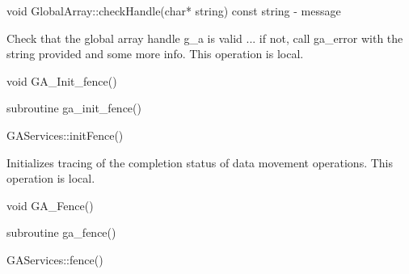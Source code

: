\documentclass[12pt]{article}
\begin{document}
\begin{cxxapi}
void GlobalArray::checkHandle(char* string) const
   string  - message                                                      \access{[input]}
\end{cxxapi}

\begin{desc}

Check that the global array handle g_a is valid ... if not, call ga_error with the string provided and some more info.
This operation is local.
\end{desc}


\begin{capi}
void GA_Init_fence()
\end{capi}

\begin{fapi}
subroutine ga_init_fence()
\end{fapi}

\begin{cxxapi}
GAServices::initFence()
\end{cxxapi}

\begin{desc}

Initializes tracing of the completion status of data movement operations.
This operation is local.
\end{desc}


\begin{capi}
void GA_Fence()
\end{capi}

\begin{fapi}
subroutine ga_fence()
\end{fapi}

\begin{cxxapi}
GAServices::fence()
\end{cxxapi}
\end{document}
